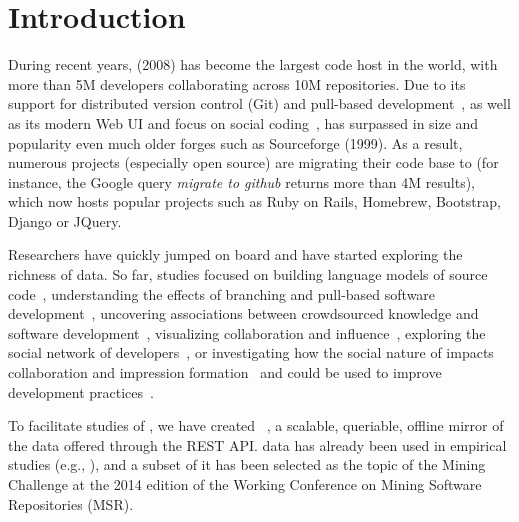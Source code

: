 
\section{Introduction}
\label{sec:intro}

During recent years, \gh (2008) has become the largest code host in the world, with more than 5M developers
collaborating across 10M repositories.
Due to its support for distributed version control (Git) and pull-based development~\cite{barr2012cohesive}, 
as well as its modern Web UI and focus on social coding~\cite{dabbish2012social}, \gh has surpassed in size
and popularity even much older forges such as Sourceforge (1999).
As a result, numerous projects (especially open source) are migrating their code base to \gh (for instance, 
the Google query \emph{migrate to github} returns more than 4M results), which now hosts popular projects
such as Ruby on Rails, Homebrew, Bootstrap, Django or JQuery.

Researchers have quickly jumped on board and have started exploring the richness of \gh data.
So far, studies focused on 
building language models of source code~\cite{allamanis2013mining}, 
understanding the effects of branching and pull-based software development~\cite{lee2013git, gousios2014exploratory}, 
uncovering associations between crowdsourced knowledge and software development~\cite{vasilescu2013stackoverflow},
visualizing collaboration and influence~\cite{heller2011visualizing}, 
exploring the social network of developers~\cite{thung2013network, schall2013follow, jiang2013understanding},
or investigating how the social nature of \gh impacts collaboration and impression formation~\cite{dabbish2012social, marlow2013impression}
and could be used to improve development practices~\cite{pham2013creating, pham2013building}.

To facilitate studies of \gh, we have created \ght~\cite{gousios2012ghtorrent, gousios2013ghtorent}, a scalable, 
queriable, offline mirror of the data offered through the \gh REST API.
\ght data has already been used in empirical studies (e.g., \cite{gousios2014exploratory, squire2014forge, 
vasilescu2013stackoverflow}), and a subset of it has been selected as the topic of the Mining Challenge
at the 2014 edition of the Working Conference on Mining Software Repositories (MSR).

